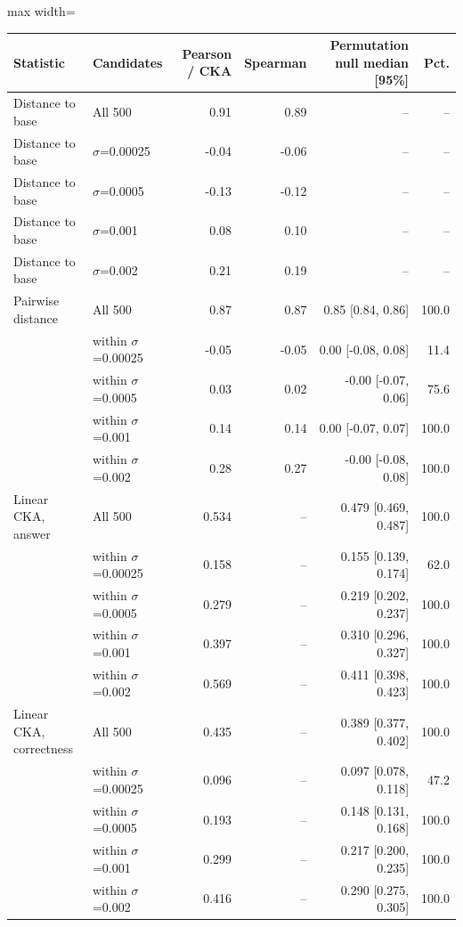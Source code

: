 \begin{table}[t]
\centering
\small
\begin{adjustbox}{max width=\linewidth}
\begin{tabular}{llrrrr}
\toprule
Statistic & Candidates & Pearson / CKA & Spearman & Permutation null median [95\%] & Pct. \\
\midrule
Distance to base & All 500 & 0.91 & 0.89 & -- & -- \\
Distance to base & $\sigma$=0.00025 & -0.04 & -0.06 & -- & -- \\
Distance to base & $\sigma$=0.0005 & -0.13 & -0.12 & -- & -- \\
Distance to base & $\sigma$=0.001 & 0.08 & 0.10 & -- & -- \\
Distance to base & $\sigma$=0.002 & 0.21 & 0.19 & -- & -- \\
\midrule
Pairwise distance & All 500 & 0.87 & 0.87 & 0.85 [0.84, 0.86] & 100.0 \\
 & within $\sigma$=0.00025 & -0.05 & -0.05 & 0.00 [-0.08, 0.08] & 11.4 \\
 & within $\sigma$=0.0005 & 0.03 & 0.02 & -0.00 [-0.07, 0.06] & 75.6 \\
 & within $\sigma$=0.001 & 0.14 & 0.14 & 0.00 [-0.07, 0.07] & 100.0 \\
 & within $\sigma$=0.002 & 0.28 & 0.27 & -0.00 [-0.08, 0.08] & 100.0 \\
\midrule
Linear CKA, answer & All 500 & 0.534 & -- & 0.479 [0.469, 0.487] & 100.0 \\
 & within $\sigma$=0.00025 & 0.158 & -- & 0.155 [0.139, 0.174] & 62.0 \\
 & within $\sigma$=0.0005 & 0.279 & -- & 0.219 [0.202, 0.237] & 100.0 \\
 & within $\sigma$=0.001 & 0.397 & -- & 0.310 [0.296, 0.327] & 100.0 \\
 & within $\sigma$=0.002 & 0.569 & -- & 0.411 [0.398, 0.423] & 100.0 \\
Linear CKA, correctness & All 500 & 0.435 & -- & 0.389 [0.377, 0.402] & 100.0 \\
 & within $\sigma$=0.00025 & 0.096 & -- & 0.097 [0.078, 0.118] & 47.2 \\
 & within $\sigma$=0.0005 & 0.193 & -- & 0.148 [0.131, 0.168] & 100.0 \\
 & within $\sigma$=0.001 & 0.299 & -- & 0.217 [0.200, 0.235] & 100.0 \\
 & within $\sigma$=0.002 & 0.416 & -- & 0.290 [0.275, 0.305] & 100.0 \\
\midrule

\end{tabular}
\end{adjustbox}
\end{table}
